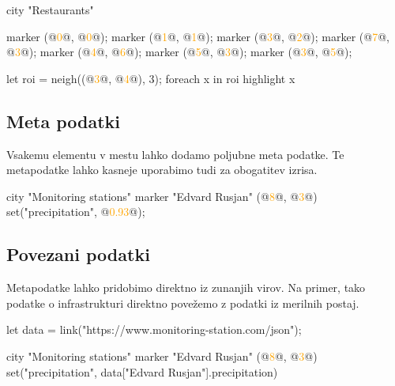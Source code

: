 \documentclass{article}
\newcommand\Num[1]{\textcolor{orange}{#1}}
\begin{document}
\begin{multicols}{2}
\begin{CITY}
  city "Restaurants" {
    marker (@\Num{0}@, @\Num{0}@);
    marker (@\Num{1}@, @\Num{1}@);
    marker (@\Num{3}@, @\Num{2}@);
    marker (@\Num{7}@, @\Num{3}@);
    marker (@\Num{4}@, @\Num{6}@);
    marker (@\Num{5}@, @\Num{3}@);
    marker (@\Num{3}@, @\Num{5}@);

    let roi = neigh((@\Num{3}@, @\Num{4}@), 3);
    foreach x in roi {
      highlight x
    }
  }
\end{CITY}

\columnbreak

\end{multicols}

\subsection{Meta podatki}
Vsakemu elementu v mestu lahko dodamo poljubne meta podatke.
Te metapodatke lahko kasneje uporabimo tudi za obogatitev izrisa.

\begin{CITY}
  city "Monitoring stations" {
    marker "Edvard Rusjan" (@\Num{8}@, @\Num{3}@) {
      set("precipitation", @\Num{0.93}@);
    }
  }
\end{CITY}

\subsection{Povezani podatki}
Metapodatke lahko pridobimo direktno iz zunanjih virov.
Na primer, tako podatke o infrastrukturi direktno povežemo z podatki iz merilnih postaj.

\begin{CITY}
  let data = link("https://www.monitoring-station.com/json");

  city "Monitoring stations" {
    marker "Edvard Rusjan" (@\Num{8}@, @\Num{3}@) {
      set("precipitation", data["Edvard Rusjan"].precipitation)
    }
  }
\end{CITY}
\end{document}
